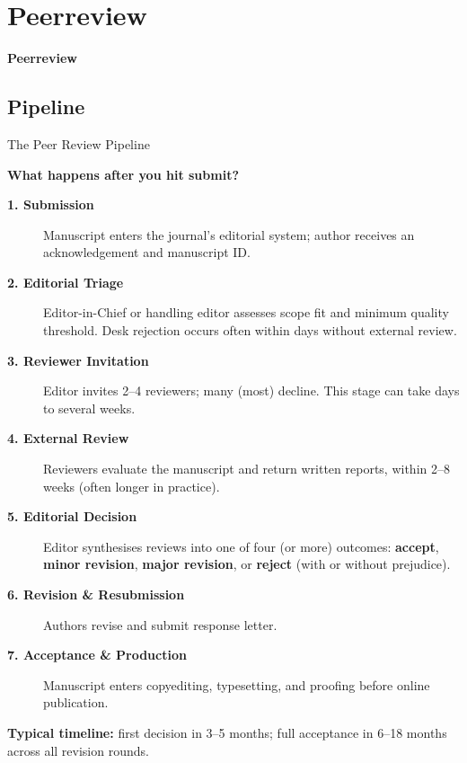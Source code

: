 \documentclass{beamer}
\begin{document}

\section{Peerreview}

\begin{frame}
  \centering
  \vfill
  {\Large\bfseries Peerreview}
  \vfill
\end{frame}



\subsection{Pipeline}
\begin{frame}{The Peer Review Pipeline}

  \footnotesize
  \textbf{What happens after you hit submit?}
  \smallskip
  \begin{description}
    \item[\textbf{1. Submission}]
      Manuscript enters the journal's editorial system;
      author receives an acknowledgement and manuscript ID.
    \item[\textbf{2. Editorial Triage}]
      Editor-in-Chief or handling editor assesses scope fit and
      minimum quality threshold. \alert{Desk rejection} occurs 
      often within days without external review.
    \item[\textbf{3. Reviewer Invitation}]
      Editor invites 2--4 reviewers; many (most) decline. This stage
      can take days to several weeks.
    \item[\textbf{4. External Review}]
      Reviewers evaluate the manuscript and return written reports,
      within 2--8 weeks (often longer in practice).
    \item[\textbf{5. Editorial Decision}]
      Editor synthesises reviews into one of four (or more) outcomes:
      \textbf{accept}, \textbf{minor revision}, \textbf{major revision},
      or \textbf{reject} (with or without prejudice).
    \item[\textbf{6. Revision \& Resubmission}]
      Authors revise and submit response letter.
    \item[\textbf{7. Acceptance \& Production}]
      Manuscript enters copyediting, typesetting, and proofing
      before online publication.
  \end{description}

  \medskip
  \textbf{Typical timeline:} first decision in 3--5 months;
  full acceptance in 6--18 months across all revision rounds.

\end{frame}
\end{document}
